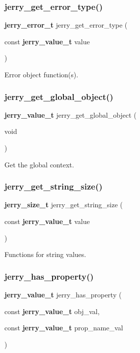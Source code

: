 \subsubsection{jerry\_get\_error\_type()}
{\footnotesize\ttfamily \textbf{ jerry\+\_\+error\+\_\+t} jerry\+\_\+get\+\_\+error\+\_\+type (\begin{DoxyParamCaption}\item[{const \textbf{ jerry\+\_\+value\+\_\+t}}]{value }\end{DoxyParamCaption})}

Error object function(s). \mbox{\label{group___core_ga8a249ac8571ce518e80f2492d650dd23}} 
\subsubsection{jerry\_get\_global\_object()}
{\footnotesize\ttfamily \textbf{ jerry\+\_\+value\+\_\+t} jerry\+\_\+get\+\_\+global\+\_\+object (\begin{DoxyParamCaption}\item[{void}]{ }\end{DoxyParamCaption})}

Get the global context. \mbox{\label{group___core_ga6ba3cfd1cd97cbad82873680f8ee466e}} 
\subsubsection{jerry\_get\_string\_size()}
{\footnotesize\ttfamily \textbf{ jerry\+\_\+size\+\_\+t} jerry\+\_\+get\+\_\+string\+\_\+size (\begin{DoxyParamCaption}\item[{const \textbf{ jerry\+\_\+value\+\_\+t}}]{value }\end{DoxyParamCaption})}

Functions for string values. \mbox{\label{group___core_ga01fdc5742be2a1fb779a9087d5922b08}} 
\subsubsection{jerry\_has\_property()}
{\footnotesize\ttfamily \textbf{ jerry\+\_\+value\+\_\+t} jerry\+\_\+has\+\_\+property (\begin{DoxyParamCaption}\item[{const \textbf{ jerry\+\_\+value\+\_\+t}}]{obj\+\_\+val,  }\item[{const \textbf{ jerry\+\_\+value\+\_\+t}}]{prop\+\_\+name\+\_\+val }\end{DoxyParamCaption})}

